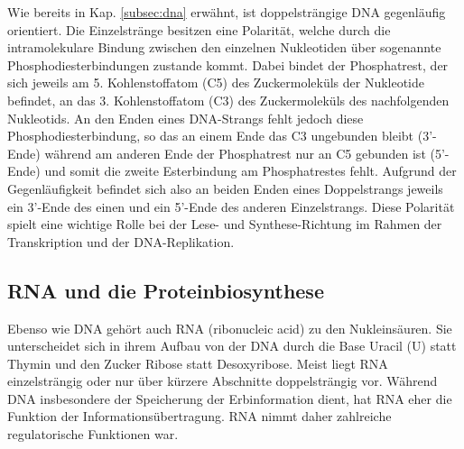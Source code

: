 Wie bereits in Kap. \ref{subsec:dna} erwähnt, ist doppelsträngige DNA gegenläufig orientiert. Die Einzelstränge besitzen eine Polarität, welche durch die intramolekulare Bindung zwischen den einzelnen Nukleotiden über sogenannte Phosphodiesterbindungen zustande kommt. Dabei bindet der Phosphatrest, der sich jeweils am 5. Kohlenstoffatom (C5) des Zuckermoleküls der Nukleotide befindet, an das 3. Kohlenstoffatom (C3) des Zuckermoleküls des nachfolgenden Nukleotids. An den Enden eines DNA-Strangs fehlt jedoch diese Phosphodiesterbindung, so das an einem Ende das C3 ungebunden bleibt (3'-Ende) während am anderen Ende der Phosphatrest nur an C5 gebunden ist (5'-Ende) und somit die zweite Esterbindung am Phosphatrestes fehlt. Aufgrund der Gegenläufigkeit befindet sich also an beiden Enden eines Doppelstrangs jeweils ein 3'-Ende des einen und ein 5'-Ende des anderen Einzelstrangs. Diese Polarität spielt eine wichtige Rolle bei der Lese- und Synthese-Richtung im Rahmen der Transkription und der DNA-Replikation.\\

\subsection{RNA und die Proteinbiosynthese} \label{subsec:protsynth}

Ebenso wie DNA gehört auch RNA (ribonucleic acid) zu den Nukleinsäuren. Sie unterscheidet sich in ihrem Aufbau von der DNA durch die Base Uracil (U) statt Thymin und den Zucker Ribose statt Desoxyribose. Meist liegt RNA einzelsträngig oder nur über kürzere Abschnitte doppelsträngig vor. Während DNA insbesondere der Speicherung der Erbinformation dient, hat RNA eher die Funktion der Informationsübertragung. RNA nimmt daher zahlreiche regulatorische Funktionen war. \\

